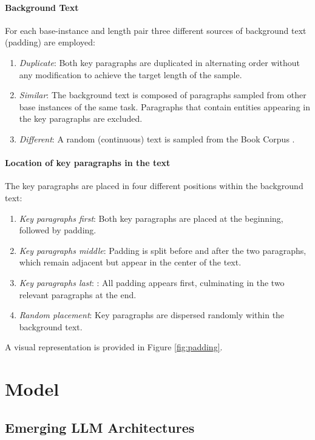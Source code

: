 \documentclass[11pt]{article}
\begin{document}
\paragraph{Background Text} For each base-instance and length pair three different  sources of background text (padding) are employed:
\begin{enumerate}
    \item \emph{Duplicate}: Both key paragraphs are duplicated in alternating order without any modification to achieve the target length of the sample.
    \item \emph{Similar}: The background text is composed of paragraphs sampled from other base instances of the same task. Paragraphs that contain entities appearing in the key paragraphs are excluded.
    \item \emph{Different}: A random (continuous) text is sampled from the Book Corpus \citep{bookcorpus}.
\end{enumerate}

\paragraph{Location of key paragraphs in the text}
 The key paragraphs are placed in four different positions within the background text:
 \begin{enumerate}
    \item \emph{Key paragraphs first}: Both key paragraphs are placed at the beginning, followed by padding.
    \item \emph{Key paragraphs middle}: Padding is split before and after the two paragraphs, which remain adjacent but appear in the center of the text.
    \item \emph{Key paragraphs last}: : All padding appears first, culminating in the two relevant paragraphs at the end.
    \item \emph{Random placement}: Key paragraphs are dispersed randomly within the background text.
\end{enumerate}

A visual representation is provided in Figure \ref{fig:padding}.\\

 
\section{Model}

\subsection{Emerging LLM Architectures}
\end{document}
